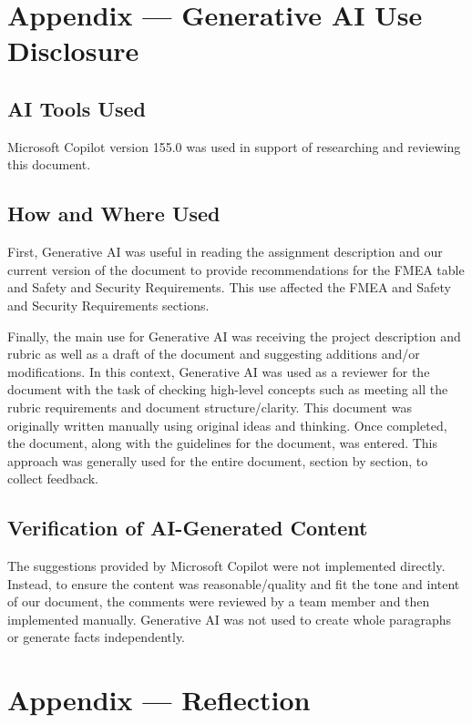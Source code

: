 \documentclass{article}
\begin{document}
\newpage{}

\section{Appendix --- Generative AI Use Disclosure}

\subsection{AI Tools Used}

Microsoft Copilot version 155.0 was used in support of researching and reviewing this document.

\subsection{How and Where Used}

First, Generative AI was useful in reading the assignment description and our current version of the document to provide recommendations for the FMEA table and Safety and Security Requirements. This use affected the FMEA and Safety and Security Requirements sections.

Finally, the main use for Generative AI was receiving the project description and rubric as well as a draft of the document and suggesting additions and/or modifications. In this context, Generative AI was used as a reviewer for the document with the task of checking high-level concepts such as meeting all the rubric requirements and document structure/clarity. This document was originally written manually using original ideas and thinking. Once completed, the document, along with the guidelines for the document, was entered. This approach was generally used for the entire document, section by section, to collect feedback.

\subsection{Verification of AI-Generated Content}

The suggestions provided by Microsoft Copilot were not implemented directly. Instead, to ensure the content was reasonable/quality and fit the tone and intent of our document, the comments were reviewed by a team member and then implemented manually. Generative AI was not used to create whole paragraphs or generate facts independently.

\newpage{}

\section{Appendix --- Reflection}
\end{document}
